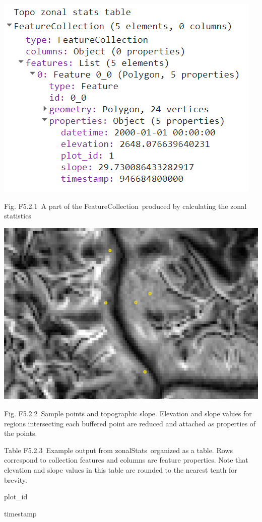 \documentclass[
  letterpaper,
  DIV=11,
  numbers=noendperiod]{scrreprt}
\begin{document}
\includegraphics{./F5/image29.png}

Fig. F5.2.1~A part of the FeatureCollection~produced by calculating the
zonal statistics

\includegraphics{./F5/image5.png}

Fig. F5.2.2~Sample points and topographic slope. Elevation and slope
values for regions intersecting each buffered point are reduced and
attached as properties of the points.

Table F5.2.3~Example output from zonalStats~organized as a table. Rows
correspond to collection features and columns are feature properties.
Note that elevation and slope values in this table are rounded to the
nearest tenth for brevity.

plot\_id

timestamp
\end{document}
